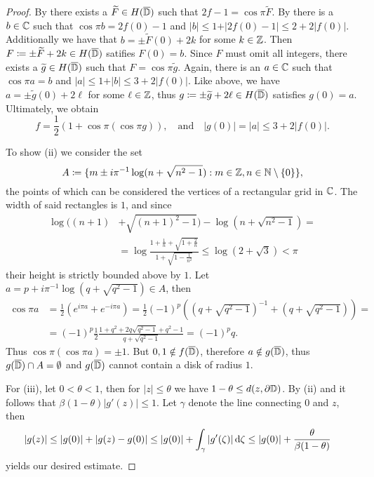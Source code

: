 \begin{proof}
    By  there exists a $\widetilde{F} \in H(\overline{\mathbb{D}})$ such that $2f - 1 = \cos \pi \widetilde{F}$. By  there is a $b \in \mathbb{C}$ such that $\cos \pi b = 2f(0) - 1$ and $\vert b \vert \leq 1 + \vert 2 f(0) - 1 \vert \leq 2 + 2 \vert f(0) \vert$. Additionally we have that $b = \pm \widetilde{F}(0) + 2k$ for some $k \in \mathbb{Z}$. Then $F \coloneqq \pm \widetilde{F} + 2k \in H(\overline{\mathbb{D}})$ satifies $F(0) = b$. Since $F$ must omit all integers, there exists a $\widetilde{g} \in H(\overline{\mathbb{D}})$ such that $F = \cos \pi \widetilde{g}$. Again, there is an $a \in \mathbb{C}$ such that $\cos \pi a = b$ and $\vert a \vert \leq 1 + \vert b \vert \leq 3 + 2 \vert f(0) \vert$. Like above, we have $a = \pm \widetilde{g}(0) + 2\ell$ for some $\ell \in \mathbb{Z}$, thus $g \coloneqq \pm \widetilde{g} + 2\ell \in H(\overline{\mathbb{D}})$ satisfies $g(0) = a$. Ultimately, we obtain
    $$ \textstyle f = \frac{1}{2} (1 + \cos \pi (\cos \pi g)), \quad \textrm{and} \quad \vert g(0) \vert = \vert a \vert \leq 3 + 2 \vert f(0) \vert. $$

    To show (ii) we consider the set
    $$ A \coloneqq \{ m \pm i \pi^{-1} \log (n + \sqrt{n^2 - 1}) : m \in \mathbb{Z}, n \in \mathbb{N} \setminus \{ 0 \} \}, $$
    the points of which can be considered the vertices of a rectangular grid in $\mathbb{C}$. The width of said rectangles is $1$, and since
    \begin{align*}
        \log ((n+1) &+ \sqrt{(n+1)^2 - 1}) - \log (n + \sqrt{n^2 - 1}) = \\
        &= \log \frac{1 + \frac{1}{n} + \sqrt{1 + \frac{2}{n}}}{1 + \sqrt{1 - \frac{1}{n^2}}} \leq \log (2 + \sqrt{3}) < \pi
    \end{align*}
    their height is strictly bounded above by $1$. Let $a = p + i \pi^{-1} \log(q + \sqrt{q^2 - 1}) \in A$, then
    \begin{align*}
        \cos \pi a &= {\textstyle\frac{1}{2}}( e^{i \pi a} + e^{-i \pi a}) = {\textstyle\frac{1}{2}} (-1)^p ((q + \sqrt{q^2 - 1})^{-1} + (q + \sqrt{q^2 - 1})) = \\
        &= (-1)^p \frac{1}{2} \frac{1 + q^2 + 2q \sqrt{q^2 - 1} + q^2 - 1}{q + \sqrt{q^2 - 1}} = (-1)^p q.
    \end{align*}
    Thus $\cos \pi (\cos \pi a) = \pm 1$. But $0, 1 \notin f(\overline{\mathbb{D}})$, therefore $a \notin g(\overline{\mathbb{D}})$, thus $g(\overline{\mathbb{D}}) \cap A = \emptyset$ and $g(\overline{\mathbb{D}})$ cannot contain a disk of radius $1$.

    For (iii), let $0 < \theta < 1$, then for $\vert z \vert \leq \theta$ we have $1 - \theta \leq d(z, \partial \mathbb{D})$. By (ii) and  it follows that $\beta (1 - \theta) \vert g'(z) \vert \leq 1$. Let $\gamma$ denote the line connecting $0$ and $z$, then
    \begin{align*}
        \vert g(z) \vert &\leq \vert g(0) \vert + \vert g(z) - g(0) \vert \leq \vert g(0) \vert + \int_\gamma \vert g'(\zeta) \vert \mathop{}\!\mathrm{d} \zeta \leq \vert g(0) \vert + \frac{\theta}{\beta (1 - \theta)}
    \end{align*}
    yields our desired estimate.
\end{proof}

